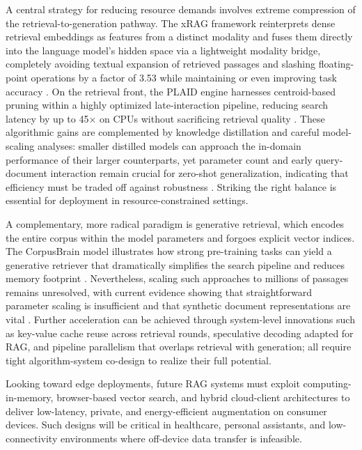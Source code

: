 \documentclass[11pt,a4paper]{article}
\begin{document}
A central strategy for reducing resource demands involves extreme compression of the retrieval-to-generation pathway. The xRAG framework reinterprets dense retrieval embeddings as features from a distinct modality and fuses them directly into the language model's hidden space via a lightweight modality bridge, completely avoiding textual expansion of retrieved passages and slashing floating-point operations by a factor of 3.53 while maintaining or even improving task accuracy \cite{arxiv:2405.13792v1}. On the retrieval front, the PLAID engine harnesses centroid-based pruning within a highly optimized late-interaction pipeline, reducing search latency by up to 45$\times$ on CPUs without sacrificing retrieval quality \cite{arxiv:2205.09707v1}. These algorithmic gains are complemented by knowledge distillation and careful model-scaling analyses: smaller distilled models can approach the in-domain performance of their larger counterparts, yet parameter count and early query-document interaction remain crucial for zero-shot generalization, indicating that efficiency must be traded off against robustness \cite{arxiv:2206.02873v5}. Striking the right balance is essential for deployment in resource-constrained settings.

A complementary, more radical paradigm is generative retrieval, which encodes the entire corpus within the model parameters and forgoes explicit vector indices. The CorpusBrain model illustrates how strong pre-training tasks can yield a generative retriever that dramatically simplifies the search pipeline and reduces memory footprint \cite{arxiv:2208.07652v1}. Nevertheless, scaling such approaches to millions of passages remains unresolved, with current evidence showing that straightforward parameter scaling is insufficient and that synthetic document representations are vital \cite{arxiv:2305.11841v1}. Further acceleration can be achieved through system-level innovations such as key-value cache reuse across retrieval rounds, speculative decoding adapted for RAG, and pipeline parallelism that overlaps retrieval with generation; all require tight algorithm-system co-design to realize their full potential.

Looking toward edge deployments, future RAG systems must exploit computing-in-memory, browser-based vector search, and hybrid cloud-client architectures to deliver low-latency, private, and energy-efficient augmentation on consumer devices. Such designs will be critical in healthcare, personal assistants, and low-connectivity environments where off-device data transfer is infeasible.
\end{document}
